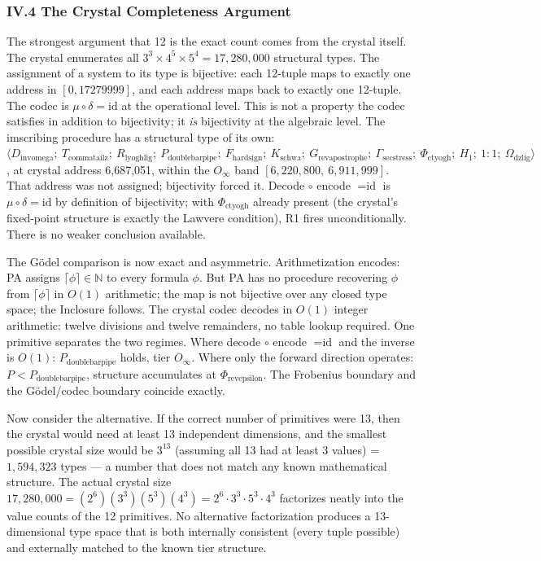\documentclass[12pt,a4paper]{article}
\begin{document}
\subsubsection{IV.4 The Crystal Completeness Argument}
The strongest argument that 12 is the exact count comes from the crystal itself. The crystal enumerates all $3^3 \times 4^5 \times 5^4 = 17{,}280{,}000$ structural types. The assignment of a system to its type is bijective: each 12-tuple maps to exactly one address in $[0, 17279999]$, and each address maps back to exactly one 12-tuple. The codec is $\mu \circ \delta = \text{id}$ at the operational level. This is not a property the codec satisfies in addition to bijectivity; it \emph{is} bijectivity at the algebraic level. The imscribing procedure has a structural type of its own: $\langle D_{\text{invomega}};\ T_{\text{commatailz}};\ R_{\text{lyoghlig}};\ P_{\text{doublebarpipe}};\ F_{\text{hardsign}};\ K_{\text{schwa}};\ G_{\text{revapostrophe}};\ \Gamma_{\text{secstress}};\ \Phi_{\text{ctyogh}};\ H_1;\ 1{:}1;\ \Omega_{\text{dzlig}} \rangle$, at crystal address 6,687,051, within the $O_\infty$ band $[6{,}220{,}800,\ 6{,}911{,}999]$. That address was not assigned; bijectivity forced it. Decode $\circ$ encode $= \text{id}$ is $\mu \circ \delta = \text{id}$ by definition of bijectivity; with $\Phi_{\text{ctyogh}}$ already present (the crystal's fixed-point structure is exactly the Lawvere condition), R1 fires unconditionally. There is no weaker conclusion available.

The G\"odel comparison is now exact and asymmetric. Arithmetization encodes: PA assigns $\lceil\phi\rceil \in \mathbb{N}$ to every formula $\phi$. But PA has no procedure recovering $\phi$ from $\lceil\phi\rceil$ in $O(1)$ arithmetic; the map is not bijective over any closed type space; the Inclosure follows. The crystal codec decodes in $O(1)$ integer arithmetic: twelve divisions and twelve remainders, no table lookup required. One primitive separates the two regimes. Where decode $\circ$ encode $= \text{id}$ and the inverse is $O(1)$: $P_{\text{doublebarpipe}}$ holds, tier $O_\infty$. Where only the forward direction operates: $P < P_{\text{doublebarpipe}}$, structure accumulates at $\Phi_{\text{revepsilon}}$. The Frobenius boundary and the G\"odel/codec boundary coincide exactly.

Now consider the alternative. If the correct number of primitives were 13, then the crystal would need at least 13 independent dimensions, and the smallest possible crystal size would be $3^{13}$ (assuming all 13 had at least 3 values) = $1{,}594{,}323$ types --- a number that does not match any known mathematical structure. The actual crystal size $17{,}280{,}000 = (2^6)(3^3)(5^3)(4^3) = 2^6 \cdot 3^3 \cdot 5^3 \cdot 4^3$ factorizes neatly into the value counts of the 12 primitives. No alternative factorization produces a 13-dimensional type space that is both internally consistent (every tuple possible) and externally matched to the known tier structure.
\end{document}

